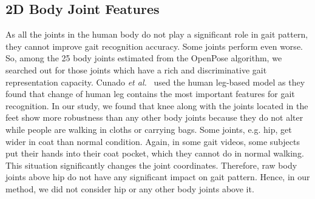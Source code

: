 \subsection{2D Body Joint Features}
As all the joints in the human body do not play a significant role in gait pattern, they cannot improve gait recognition accuracy. Some joints perform even worse. So, among the 25 body joints estimated from the OpenPose algorithm, we searched out for those joints which have a rich and discriminative gait representation capacity. Cunado \textit{et al.}~\cite{Cunado_97} used the human leg-based model as they found that change of human leg contains the most important features for gait recognition.  In our study, we found that knee along with the joints located in the feet show more robustness than any other body joints because they do not alter while people are walking in cloths or carrying bags. Some joints, e.g. hip, get wider in coat than normal condition. Again, in some gait videos, some subjects put their hands into their coat pocket, which they cannot do in normal walking. This situation significantly changes the joint coordinates. Therefore, raw body joints above hip do not have any significant impact on gait pattern. Hence, in our method, we did not consider hip or any other body joints above it.

